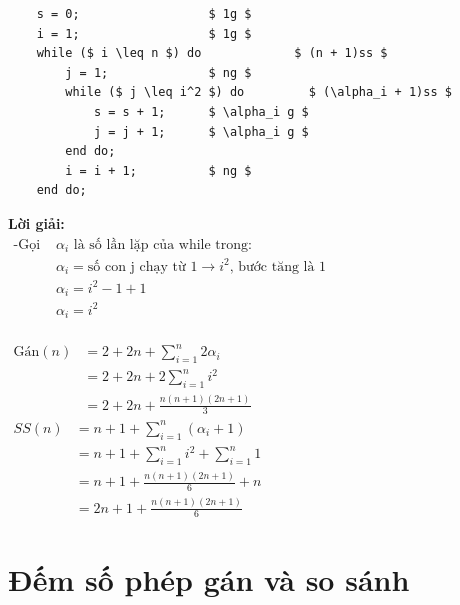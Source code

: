 \documentclass[12pt, letterpaper]{article}
\begin{document}
\begin{lstlisting}
    s = 0;                  $ 1g $
    i = 1;                  $ 1g $
    while ($ i \leq n $) do             $ (n + 1)ss $
        j = 1;              $ ng $
        while ($ j \leq i^2 $) do         $ (\alpha_i + 1)ss $
            s = s + 1;      $ \alpha_i g $
            j = j + 1;      $ \alpha_i g $
        end do;
        i = i + 1;          $ ng $
    end do;
  \end{lstlisting}
\textbf{Lời giải:} \\
$ \begin{aligned}
	\text{-Gọi } & \alpha_i \text{ là số lần lặp của while trong:}                              \\
				& \alpha_i = \text{số con j chạy từ 1} \rightarrow i^2 \text{, bước tăng là 1} \\
				& \alpha_i = i^2 - 1 + 1                                                       \\
				& \alpha_i = i^2
	\end{aligned} $ \\
 \\
$ \begin{aligned}
	\text{Gán}(n) & = 2 + 2n + \sum^{n}_{i = 1} 2 \alpha_i \\
	              & = 2 + 2n + 2 \sum^{n}_{i = 1} i^2      \\
	              & = 2 + 2n + \frac{n(n + 1)(2n + 1)}{3}
\end{aligned} $ \\

$ \begin{aligned}
	SS(n) & = n + 1 + \sum^{n}_{i = 1} (\alpha_i + 1)           \\
	      & = n + 1 + \sum^{n}_{i = 1} i^2 + \sum^{n}_{i = 1} 1 \\
	      & = n + 1 + \frac{n(n + 1)(2n + 1)}{6} + n            \\
	      & = 2n + 1 + \frac{n(n + 1)(2n + 1)}{6}
\end{aligned} $ \\

\section{Đếm số phép gán và so sánh}
\end{document}
